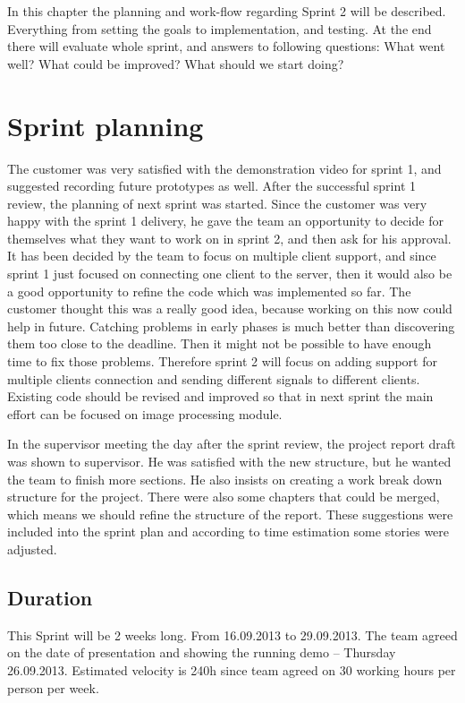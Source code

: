 In this chapter the planning and work-flow regarding Sprint 2 will be described. 
Everything from setting the goals to implementation, and testing. At the end there will evaluate whole sprint, and answers to following questions: What went well? What could be improved? What should we start doing? 

\section{Sprint planning}
The customer was very satisfied with the demonstration video for sprint 1, and suggested recording future prototypes as well. 
After the successful sprint 1 review, the planning of next sprint was started. 
Since the customer was very happy with the sprint 1 delivery, he gave the team an opportunity to decide for themselves what they want to work on in sprint 2, and then ask for his approval.
It has been decided by the team to focus on multiple client support, and since sprint 1 just focused on connecting one client to the server, then it would also be a good opportunity to refine the code which was implemented so far. 
The customer thought this was a really good idea, because working on this now could help in future. 
Catching problems in early phases is much better than discovering them too close to the deadline. 
Then it might not be possible to have enough time to fix those problems.
Therefore sprint 2 will focus on adding support for multiple clients connection and sending different signals to different clients. 
Existing code should be revised and improved so that in next sprint the main effort can be focused on image processing module.


In the supervisor meeting the day after the sprint review, the project report draft was shown to supervisor. 
He was satisfied with the new structure, but he wanted the team to finish more sections. He also insists on creating a work break down structure for the project. 
There were also some chapters that could be merged, which means we should refine the structure of the report. 
These suggestions were included into the sprint plan and according to time estimation some stories were adjusted.

\subsection{Duration}
This Sprint will be 2 weeks long. From 16.09.2013 to 29.09.2013.
The team agreed on the date of presentation and showing the running demo -- Thursday 26.09.2013.
Estimated velocity is 240h since team agreed on 30 working hours per person per week.

